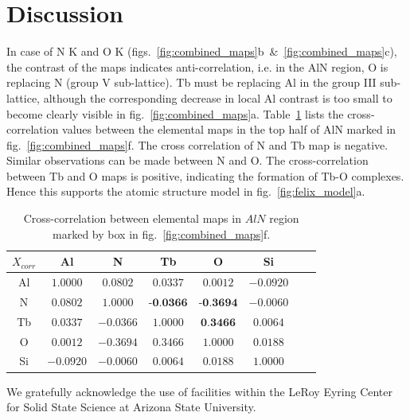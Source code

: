 \documentclass[%
aip,
rsi,%
 amsmath,amssymb,%
 reprint,%
]{revtex4-1}
\begin{document}
\section{Discussion} %
\label{sec:discussion}
In case of N K and O K (figs.~\ref{fig:combined_maps}b~\&~\ref{fig:combined_maps}c), the contrast of the maps indicates anti-correlation, i.e. in the AlN region, O is replacing N (group V sub-lattice). Tb must be replacing Al in the group III sub-lattice, although the corresponding decrease in local Al contrast is too small to become clearly visible in fig.~\ref{fig:combined_maps}a. Table~\ref{tab:xcorr} lists the cross-correlation values between the elemental maps in the top half of AlN marked in fig.~\ref{fig:combined_maps}f. The cross correlation of N and Tb map is negative. Similar observations can be made between N and O. The cross-correlation between Tb and O maps is positive, indicating the formation of Tb-O complexes. Hence this supports the atomic structure model in fig.~\ref{fig:felix_model}a.
\begin{table}%
	\caption{Cross-correlation between elemental maps in $AlN$ region marked by box in fig.~\ref{fig:combined_maps}f.}
    \label{tab:xcorr}
    \begin{ruledtabular}
    	\begin{tabular}{cccccccc}
        	$X_{corr}$&Al&N&Tb&O&Si													\\ \hline
            Al& $1.0000$& $0.0802$& $0.0337$& $0.0012$&$-0.0920$					\\
             N& $0.0802$& $1.0000$& $\textbf{-0.0366}$&$\textbf{-0.3694}$&$-0.0060$	\\
            Tb& $0.0337$&$-0.0366$& $1.0000$& $\textbf{0.3466}$&$0.0064$			\\
             O& $0.0012$&$-0.3694$&	$0.3466$& $1.0000$&$0.0188$						\\
            Si&$-0.0920$&$-0.0060$&$0.0064$&$0.0188$& $1.0000$
    	\end{tabular}
    \end{ruledtabular}
\end{table}

\begin{acknowledgments}
We gratefully acknowledge the use of facilities within the LeRoy Eyring Center for Solid State Science at Arizona State University.
\end{acknowledgments}

\end{document}
